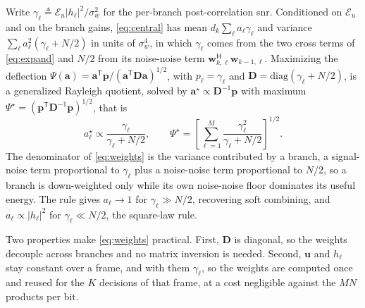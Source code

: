 \documentclass[12pt, draftclsnofoot, onecolumn]{IEEEtran}
\newcommand{\Eu}{\mathcal{E}_u}
\newenvironment{revblock}{}{}
\begin{document}
\begin{revblock}
Write $\gamma_\ell \triangleq \Eu|h_\ell|^2/\sigma_w^2$ for the per-branch
post-correlation \ac{snr}. Conditioned on $\Eu$ and on the branch gains,
\eqref{eq:central} has mean $d_k\sum_\ell a_\ell\gamma_\ell$ and variance
$\sum_\ell a_\ell^2(\gamma_\ell+N/2)$ in units of $\sigma_w^4$, in which
$\gamma_\ell$ comes from the two cross terms of \eqref{eq:expand} and $N/2$ from
its noise-noise term $\mathbf{w}_{k,\ell}^{\mathsf{H}}\mathbf{w}_{k-1,\ell}$.
Maximizing the deflection
$\Psi(\mathbf{a})=\mathbf{a}^{\mathsf{T}}\mathbf{p}/(\mathbf{a}^{\mathsf{T}}
\mathbf{D}\mathbf{a})^{1/2}$, with $p_\ell=\gamma_\ell$ and
$\mathbf{D}=\mathrm{diag}(\gamma_\ell+N/2)$, is a generalized Rayleigh
quotient, solved by $\mathbf{a}^\star\propto\mathbf{D}^{-1}\mathbf{p}$ with
maximum $\Psi^\star=(\mathbf{p}^{\mathsf{T}}\mathbf{D}^{-1}
\mathbf{p})^{1/2}$, that is
\begin{equation}
a_\ell^{\star}\propto\frac{\gamma_\ell}{\gamma_\ell+N/2},
\qquad
\Psi^{\star}=\left[\sum_{\ell=1}^{M}\frac{\gamma_\ell^{2}}{\gamma_\ell+N/2}\right]^{1/2}.
\label{eq:weights}
\end{equation}
The denominator of \eqref{eq:weights} is the variance contributed by a branch, a
signal-noise term proportional to $\gamma_\ell$ plus a noise-noise term
proportional to $N/2$, so a branch is down-weighted only while its own
noise-noise floor dominates its useful energy. The rule gives $a_\ell\to1$ for
$\gamma_\ell\gg N/2$, recovering soft combining, and $a_\ell\propto|h_\ell|^2$
for $\gamma_\ell\ll N/2$, the square-law rule.

Two properties make \eqref{eq:weights} practical. First, $\mathbf{D}$ is
diagonal, so the weights decouple across branches and no matrix inversion is
needed. Second, $\mathbf{u}$ and $h_\ell$ stay constant over a frame, and with
them $\gamma_\ell$, so the weights are computed once and reused for the $K$
decisions of that frame, at a cost negligible against the $MN$ products per bit.


\end{revblock}
\end{document}
